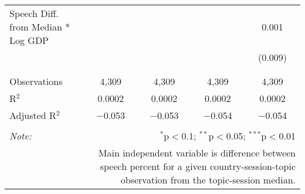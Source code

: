 \begin{table}[!htbp]
\begin{tabular}{@{\extracolsep{5pt}}lcccc}
 Speech Diff. from Median * Log GDP &  &  &  & 0.001 \\ 
  &  &  &  & (0.009) \\ 
  & & & & \\ 
\hline \\[-1.8ex] 
Observations & 4,309 & 4,309 & 4,309 & 4,309 \\ 
R$^{2}$ & 0.0002 & 0.0002 & 0.0002 & 0.0002 \\ 
Adjusted R$^{2}$ & $-$0.053 & $-$0.053 & $-$0.054 & $-$0.054 \\ 
\hline 
\hline \\[-1.8ex] 
\textit{Note:}  & \multicolumn{4}{r}{$^{*}$p$<$0.1; $^{**}$p$<$0.05; $^{***}$p$<$0.01} \\ 
 & \multicolumn{4}{r}{Main independent variable is difference between speech percent for a given country-session-topic observation from the topic-session median.} \\ 
\end{tabular} 
\end{table} 
